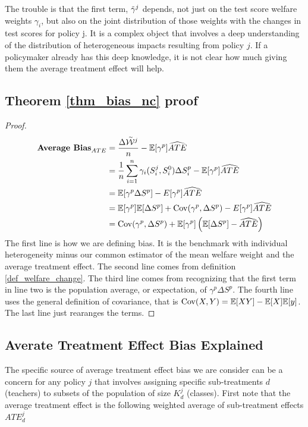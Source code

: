 \documentclass[12pt]{article}
\theoremstyle{definition}
\theoremstyle{definition}
\theoremstyle{definition}
\theoremstyle{definition}
\begin{document}
    The trouble is that the first term, $\Tilde{\gamma}^j$ depends, not just on the test score welfare weights $\gamma_i$, but also on the joint distribution of those weights with the changes in test scores for policy j. It is a complex object that involves a deep understanding of the distribution of heterogeneous impacts resulting from policy $j$. If a policymaker already has this deep knowledge, it is not clear how much giving them the average treatment effect will help.



    \subsection{Theorem \ref{thm_bias_nc} proof}
    \label{th_bias_nc_proof}
    \begin{proof}
    \begin{align*}
        \textbf{Average Bias}_{ATE} &= \frac{\Delta \accentset{\sim}{\mathcal{W}}^j}{n} - \mathbb{E}[\gamma^p] \widehat{ATE} \\
       & =   \frac{1}{n}\sum_{i=1}^n \gamma_i(S_i^j, S_i^0) \Delta S^p_i - \mathbb{E}[\gamma^p] \widehat{ATE}  \\
        & =  \mathbb{E}[\gamma^p \Delta S^p] - E[\gamma^p] \widehat{ATE}  \\
       & =  \mathbb{E}[\gamma^p] \mathbb{E}[\Delta S^p] + \mathrm{Cov}(\gamma^p, \Delta S^p) - E[\gamma^p] \widehat{ATE}  \\
       & = \mathrm{Cov}(\gamma^p, \Delta S^p) +\mathbb{E}[\gamma^p] \left (\mathbb{E}[\Delta S^p]-\widehat{ATE} \right )
    \end{align*} 
    The first line is how we are defining bias. It is the benchmark with individual heterogeneity minus our common estimator of the mean welfare weight and the average treatment effect. The second line comes from definition \ref{def_welfare_change}. The third line comes from recognizing that the first term in line two is the population average, or expectation, of $\gamma^p \Delta S^p$. The fourth line uses the general definition of covariance, that is $\mathrm{Cov}(X,Y) = \mathbb{E}[XY] - \mathbb{E}[X]\mathbb{E}[y]$. The last line just rearanges the terms. 
    \end{proof}

\subsection{Averate Treatment Effect Bias Explained}
\label{ATE_bias_appendix}

    The specific source of average treatment effect bias we are consider can be a concern for any  policy $j$ that involves assigning specific sub-treatments $d$ (teachers) to subsets of the population of size $K^j_d$ (classes). First note that the average treatment effect is the following weighted average of sub-treatment effects $ATE^j_d$
    
\end{document}

